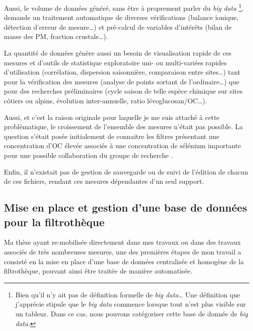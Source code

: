 Aussi, le volume de données généré, sans être à proprement parler du \textit{big data}
\footnote{Bien qu'il n'y ait pas de définition formelle de \textit{big data}…  Une
    définition que j'apprécie stipule que le \textit{big data} commence lorsque tout
    n'est plus visible sur un tableur. Dans ce cas, nous pouvons catégoriser cette base de
donnée de \textit{big data}.},
demande un traitement automatique de diverses vérifications (balance ionique, détection
d'erreur de mesure…) et pré-calcul de variables d'intérêts (bilan de masse des PM,
fraction crustale…).

La quantité de données génère aussi un besoin de visualisation rapide de ces mesures et
d'outils de statistique exploratoire uni- ou multi-variées rapides d'utilisation
(corrélation, dispersion saisonnière, comparaison entre sites…) tant pour la vérification
des mesures (analyse de points sortant de l'ordinaire…) que pour des recherches
préliminaires (cycle saison de telle espèce chimique sur sites côtiers ou alpins, évolution
inter-annuelle, ratio lévoglucosan/OC…).

Aussi, et c'est la raison originale pour laquelle je me suis attaché à cette
problématique, le croissement de l'ensemble des mesures n'était pas possible. La question
s'était posée initialement de connaitre les filtres présentant une concentration d'OC
élevée associés à une concentration de sélénium importante pour une possible collaboration
du groupe de recherche \parencite{toluDistribution2014,luxemStudying2017}.

Enfin, il n'existait pas de gestion de sauvegarde ou de suivi de l'édition
de chacun de ces fichiers, rendant ces mesures dépendantes d'un seul support.

\subsection{Mise en place et gestion d'une base de données pour la filtrothèque}%
\label{sub:mise_en_place_et_gestion_d_une_base_de_donnée_pour_la_filtrothèque}

\begin{tcolorbox}[colback=red!5!white,colframe=Melon,title=Note]
Ma thèse ayant re-mobilisée directement dans mes travaux ou dans des travaux associés de
très nombreuses mesures, une des premières étapes de mon travail a consisté en la mise en place d'une
base de données centralisée et homogène de la filtrothèque, pouvant ainsi être traitée de
manière automatisée.
\end{tcolorbox}

